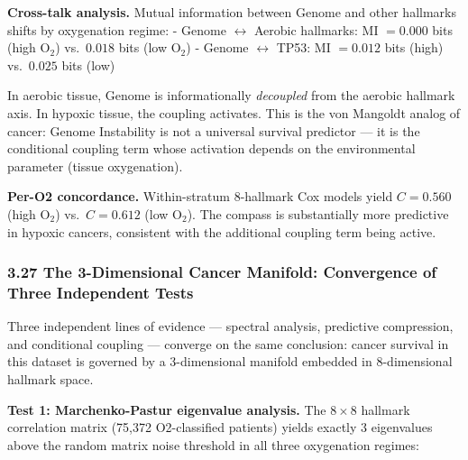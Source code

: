 \documentclass[
  11pt,
]{article}
\begin{document}
\textbf{Cross-talk analysis.} Mutual information between Genome and
other hallmarks shifts by oxygenation regime: - Genome
\(\leftrightarrow\) Aerobic hallmarks: MI \(= 0.000\) bits (high
\(\mathrm{O}_2\)) vs.~\(0.018\) bits (low \(\mathrm{O}_2\)) - Genome
\(\leftrightarrow\) TP53: MI \(= 0.012\) bits (high) vs.~\(0.025\) bits
(low)

In aerobic tissue, Genome is informationally \emph{decoupled} from the
aerobic hallmark axis. In hypoxic tissue, the coupling activates. This
is the von Mangoldt analog of cancer: Genome Instability is not a
universal survival predictor --- it is the conditional coupling term
whose activation depends on the environmental parameter (tissue
oxygenation).

\textbf{Per-O2 concordance.} Within-stratum 8-hallmark Cox models yield
\(C = 0.560\) (high \(\mathrm{O}_2\)) vs.~\(C = 0.612\) (low
\(\mathrm{O}_2\)). The compass is substantially more predictive in
hypoxic cancers, consistent with the additional coupling term being
active.

\subsubsection{3.27 The 3-Dimensional Cancer Manifold: Convergence of
Three Independent
Tests}\label{the-3-dimensional-cancer-manifold-convergence-of-three-independent-tests}

Three independent lines of evidence --- spectral analysis, predictive
compression, and conditional coupling --- converge on the same
conclusion: cancer survival in this dataset is governed by a
3-dimensional manifold embedded in 8-dimensional hallmark space.

\textbf{Test 1: Marchenko-Pastur eigenvalue analysis.} The
\(8 \times 8\) hallmark correlation matrix (75,372 O2-classified
patients) yields exactly 3 eigenvalues above the random matrix noise
threshold in all three oxygenation regimes:
\end{document}
